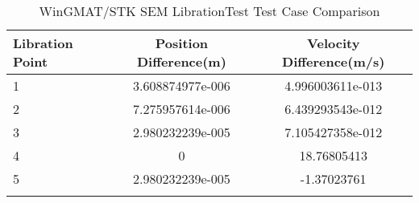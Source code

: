 \begin{table}[htbp!]
\centering
\caption{ WinGMAT/STK SEM LibrationTest Test Case Comparison}
      \begin{tabular}{lcc}
      \hline\hline
          Libration Point & Position Difference(m) & Velocity Difference(m/s) \\
         \hline
         1 & 3.608874977e-006 & 4.996003611e-013 \\
         2 & 7.275957614e-006 & 6.439293543e-012 \\
         3 & 2.980232239e-005 & 7.105427358e-012 \\
         4 & 0 & 18.76805413 \\
         5 & 2.980232239e-005 & -1.37023761 \\
      \hline\hline
      \label{Table: WinGMAT-STK SEM LibrationTest Table} 
\end{tabular}
\end{table}
